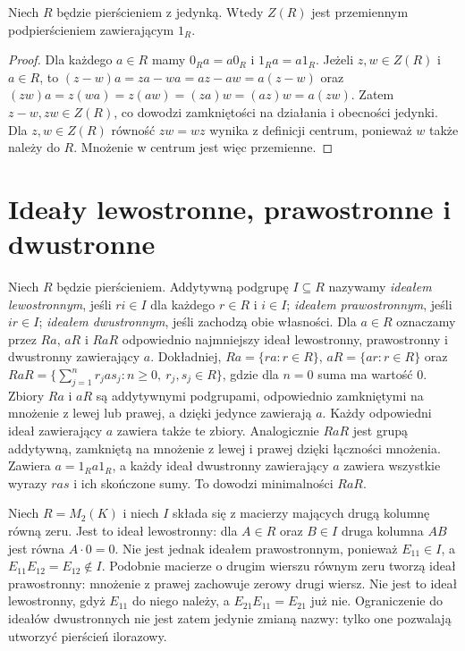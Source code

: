 \begin{stwierdzenie}
\label{aa:st:nc-center-subring}
Niech $R$ będzie pierścieniem z jedynką. Wtedy $Z(R)$
jest przemiennym podpierścieniem zawierającym $1_R$.
\end{stwierdzenie}
\begin{proof}
Dla każdego $a\in R$ mamy $0_Ra=a0_R$ i $1_Ra=a1_R$.
Jeżeli $z,w\in Z(R)$ i $a\in R$, to
$(z-w)a=za-wa=az-aw=a(z-w)$ oraz
$(zw)a=z(wa)=z(aw)=(za)w=(az)w=a(zw)$.
Zatem $z-w,zw\in Z(R)$, co dowodzi zamkniętości
na działania i obecności jedynki. Dla $z,w\in Z(R)$
równość $zw=wz$ wynika z definicji centrum, ponieważ
$w$ także należy do $R$. Mnożenie w centrum jest
więc przemienne.
\end{proof}

\section{Ideały lewostronne, prawostronne i dwustronne}
\begin{definicja}
\label{aa:def:nc-ideals}
Niech $R$ będzie pierścieniem. Addytywną podgrupę
$I\subseteq R$ nazywamy \emph{ideałem lewostronnym}, jeśli
$ri\in I$ dla każdego $r\in R$ i $i\in I$;
\emph{ideałem prawostronnym}, jeśli $ir\in I$;
\emph{ideałem dwustronnym}, jeśli zachodzą obie własności.
Dla $a\in R$ oznaczamy przez $Ra$, $aR$ i $RaR$
odpowiednio najmniejszy ideał lewostronny, prawostronny
i dwustronny zawierający $a$. Dokładniej,
$Ra=\{ra:r\in R\}$, $aR=\{ar:r\in R\}$ oraz
$RaR=\{\sum_{j=1}^n r_ja s_j:n\ge0,\ r_j,s_j\in R\}$,
gdzie dla $n=0$ suma ma wartość $0$.
Zbiory $Ra$ i $aR$ są addytywnymi podgrupami,
odpowiednio zamkniętymi na mnożenie z lewej lub prawej,
a dzięki jedynce zawierają $a$. Każdy odpowiedni ideał
zawierający $a$ zawiera także te zbiory.
Analogicznie $RaR$ jest grupą addytywną, zamkniętą
na mnożenie z lewej i prawej dzięki łączności mnożenia.
Zawiera $a=1_Ra1_R$, a każdy ideał dwustronny
zawierający $a$ zawiera wszystkie wyrazy $ras$ i ich
skończone sumy. To dowodzi minimalności $RaR$.
\end{definicja}

\begin{przyklad}
\label{aa:prz:nc-one-sided}
Niech $R=M_2(K)$ i niech $I$ składa się z macierzy
mających drugą kolumnę równą zeru. Jest to ideał
lewostronny: dla $A\in R$ oraz $B\in I$ druga
kolumna $AB$ jest równa $A\cdot0=0$.
Nie jest jednak ideałem prawostronnym, ponieważ
$E_{11}\in I$, a $E_{11}E_{12}=E_{12}\notin I$.
Podobnie macierze o drugim wierszu równym zeru
tworzą ideał prawostronny: mnożenie z prawej
zachowuje zerowy drugi wiersz. Nie jest to ideał
lewostronny, gdyż $E_{11}$ do niego należy,
a $E_{21}E_{11}=E_{21}$ już nie.
Ograniczenie do ideałów dwustronnych nie jest zatem
jedynie zmianą nazwy: tylko one pozwalają utworzyć
pierścień ilorazowy.
\end{przyklad}

